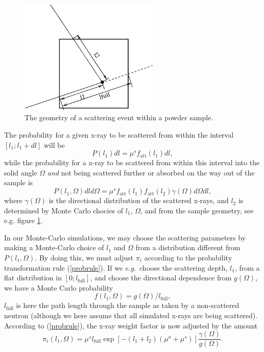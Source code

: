 \begin{figure}
  \begin{center}
    \includegraphics[width=0.6\textwidth]{figures/scatter.eps}
  \end{center}
\caption{The geometry of a scattering event within a powder sample.}
\label{powderFig}
\end{figure}

The probability for a given x-ray to be scattered from within the interval
$[ l_1 ; l_1+dl ]$ will be
\begin{equation}
P(l_1) dl = \mu^s f_\mathrm{att}(l_1) dl ,
\end{equation}
while the probability for a x-ray to be scattered from within
this interval into the solid angle $\Omega$ {\em and}
not being scattered further
or absorbed on the way out of the sample is
\begin{equation}
P(l_1,\Omega) dl d\Omega =
  \mu^s f_\mathrm{att}(l_1) f_\mathrm{att}(l_2) \gamma(\Omega) d\Omega dl ,
\end{equation}
where $\gamma(\Omega)$ is the directional distribution
of the scattered x-rays, and $l_2$ is determined by
Monte Carlo chocies of $l_1$, $\Omega$,
and from the sample geometry, see e.g. figure \ref{powderFig}.

In our Monte-Carlo simulations, we may choose the scattering
parameters by making a Monte-Carlo choice of $l_1$ and $\Omega$
from a distribution different from $P(l_1,\Omega)$.
By doing this, we must adjust $\pi_i$ according to
the probability transformation rule (\ref{probrule}).
If we {\em e.g.}\ choose the scattering depth, $l_1$,
from a flat distribution in $[ 0 ; l_\mathrm{full} ]$,
and choose the directional dependence from $g(\Omega)$,
we have a Monte Carlo probability
\begin{equation}
f(l_1,\Omega) = g(\Omega) / l_\mathrm{full} ,
\end{equation}
$l_\mathrm{full}$ is here the path length through the sample
as taken by a non-scattered neutron (although we here
assume that all simulated x-rays are being scattered).
According to (\ref{probrule}), the x-ray weight factor
is now adjusted by the amount
\begin{equation}     \label{sampleprob}
\pi_i(l_1,\Omega) =
 \mu^s l_\mathrm{full} \exp \left[ - (l_1+l_2) (\mu^a + \mu^s) \right]
  \frac{\gamma(\Omega)}{g(\Omega)} .
\end{equation}

